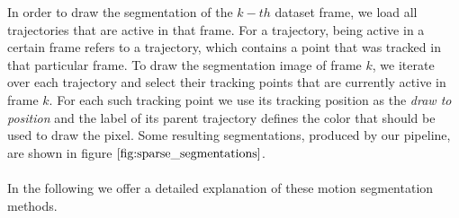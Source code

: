 In order to draw the segmentation of the $k-th$ dataset frame, we load all trajectories that are active in that frame. For a trajectory, being active in a certain frame refers to a trajectory, which contains a point that was tracked in that particular frame. To draw the segmentation image of frame $k$, we iterate over each trajectory and select their tracking points that are currently active in frame $k$. For each such tracking point we use its tracking position as the \textit{draw to position} and the label of its parent trajectory defines the color that should be used to draw the pixel. Some resulting segmentations, produced by our pipeline, are shown in figure $\ref{fig:sparse_segmentations}$.\\ \\
In the following we offer a detailed explanation of these motion segmentation methods.
